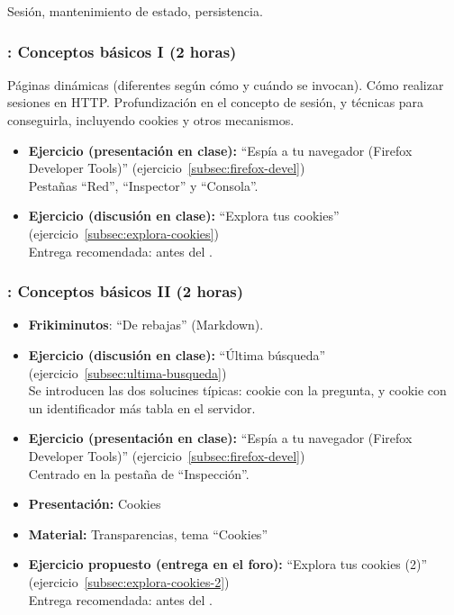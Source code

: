 \documentclass[a4paper,12pt]{article}
\begin{document}
Sesión, mantenimiento de estado, persistencia.

\subsubsection{\martesA: Conceptos básicos I (2 horas)}
\label{cal:martesA}

Páginas dinámicas (diferentes según cómo y cuándo se invocan). Cómo realizar sesiones en HTTP. Profundización en el concepto de sesión, y técnicas para conseguirla, incluyendo cookies y otros mecanismos.

\begin{itemize}
\item \textbf{Ejercicio (presentación en clase):} ``Espía a tu navegador (Firefox Developer Tools)'' (ejercicio~\ref{subsec:firefox-devel}) \\
  Pestañas ``Red'', ``Inspector'' y ``Consola''.
\item \textbf{Ejercicio (discusión en clase):} ``Explora tus cookies'' (ejercicio~\ref{subsec:explora-cookies}) \\
  Entrega recomendada: antes del \martesB.
\end{itemize}


\subsubsection{\martesB: Conceptos básicos II (2 horas)}
\label{cal:martesB}

\begin{itemize}
\item \textbf{Frikiminutos}: ``De rebajas'' (Markdown).
\item \textbf{Ejercicio (discusión en clase):} ``Última búsqueda'' (ejercicio~\ref{subsec:ultima-busqueda}) \\
  Se introducen las dos solucines típicas: cookie con la pregunta, y cookie con un identificador más tabla en el servidor.
\item \textbf{Ejercicio (presentación en clase):} ``Espía a tu navegador (Firefox Developer Tools)'' (ejercicio~\ref{subsec:firefox-devel}) \\
  Centrado en la pestaña de ``Inspección''.
\item \textbf{Presentación:} Cookies
\item \textbf{Material:} Transparencias, tema ``Cookies''
\item \textbf{Ejercicio propuesto (entrega en el foro):} ``Explora tus cookies (2)'' (ejercicio~\ref{subsec:explora-cookies-2}) \\
  Entrega recomendada: antes del \martesC. \\
\end{itemize}
\end{document}
